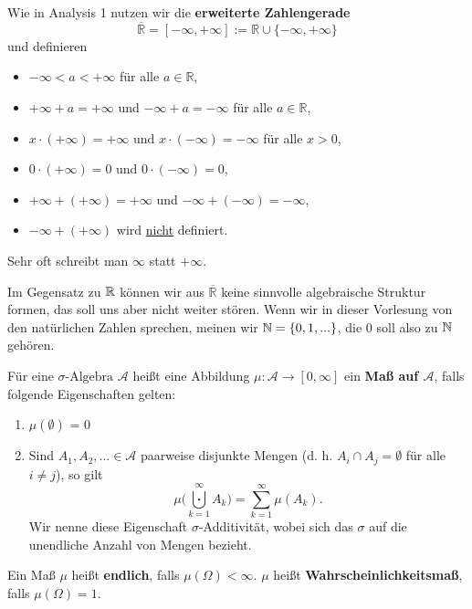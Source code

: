 \begin{lreminder}
Wie in Analysis 1 nutzen wir die \textbf{erweiterte Zahlengerade} $$\overline{\mathbb{R}} = [-\infty, +\infty] := \mathbb{R} \cup \{ -\infty, +\infty \}$$ und definieren
\begin{itemize}
	\item $-\infty < a < +\infty$ f\"ur alle $a\in \mathbb R$,
		\item $+\infty + a = +\infty$ und $-\infty + a = -\infty$ f\"ur alle $ a \in \mathbb{R}$,
	\item $x \cdot (+\infty)=+\infty$ und $x \cdot (-\infty)=-\infty$ f\"ur alle $x>0$,
	\item $0\cdot (+\infty)=0$ und $0\cdot (-\infty)=0$,
	\item $+\infty+(+\infty)=+\infty$ und $-\infty+(-\infty)=-\infty$,
	\item $-\infty+(+\infty)$ wird \underline{nicht} definiert.
\end{itemize}	
Sehr oft schreibt man $\infty$ statt $+\infty$.
\end{lreminder}
Im Gegensatz zu $\mathbb{R}$ k\"onnen wir aus $\overline{\mathbb{R}}$ keine sinnvolle algebraische Struktur formen, das soll uns aber nicht weiter st\"oren. Wenn wir in dieser Vorlesung von den nat\"urlichen Zahlen sprechen, meinen wir $\mathbb{N}=\{0,1,...\}$, die $0$ soll also zu $\mathbb{N}$ geh\"oren.
\begin{lDef}
\begin{deff}
Für eine $\sigma\text{-Algebra } \mathcal{A}$ heißt eine Abbildung $\mu \! : \mathcal{A} \to [0, \infty]$ ein \textbf{Maß auf $\mathcal{A}$}, falls folgende Eigenschaften gelten:
\begin{enumerate}[label=(\roman*)]
	\item $\mu (\emptyset)$ = 0
	\item Sind $A_{1}, A_{2},...\in \mathcal{A}$ paarweise disjunkte Mengen (d. h. $A_i\cap A_j=\emptyset$ f\"ur alle $i\neq j$), so gilt $$\mu\Big(\bigcupdot\limits_{k=1}^{\infty}A_{k}\Big)=\sum\limits_{k=1}^{\infty}\mu (A_{k}).$$ Wir nenne diese Eigenschaft $\sigma$-Additivität, wobei sich das $\sigma$ auf die unendliche Anzahl von Mengen bezieht. 
\end{enumerate}

Ein Ma\ss{} $\mu$ heißt \textbf{endlich}, falls $\mu (\Omega) < \infty$. $\mu$ heißt \textbf{Wahrscheinlichkeitsmaß}, falls $\mu (\Omega) = 1$.
\end{deff}
\end{lDef}
